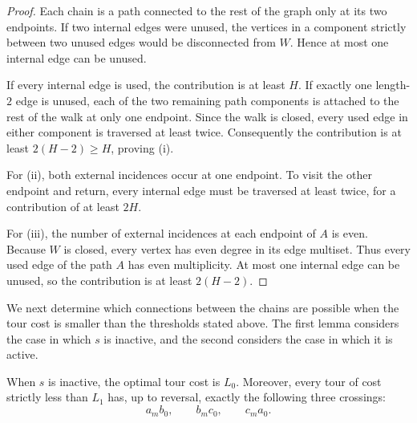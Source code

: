 \documentclass[12pt,a4paper,oneside]{report}
\begin{document}
\begin{proof}
Each chain is a path connected to the rest of the graph only at its two
endpoints.  If
two internal edges were unused, the vertices in a component strictly between
two unused edges would be disconnected from $W$.  Hence at most
one internal edge can be unused.

If every internal edge is used, the contribution is at least $H$.  If exactly
one length-$2$ edge is unused, each of the two remaining path components is
attached to the rest of the walk at only one endpoint.  Since the walk is
closed, every used edge in either component is traversed at least twice.
Consequently the contribution is at least $2(H-2)\ge H$, proving (i).

For (ii), both external incidences occur at one endpoint.  To visit the other
endpoint and return, every internal edge must be traversed at least twice, for
a contribution of at least $2H$.

For (iii), the number of external incidences at each endpoint of $A$ is even.
Because $W$ is closed, every vertex has even degree in its edge multiset.
Thus every used edge of the path $A$ has even multiplicity.  At most one
internal edge can be unused, so the contribution is at least $2(H-2)$.
\end{proof}

We next determine which connections between the chains are possible when the
tour cost is smaller than the thresholds stated above.  The first lemma
considers the case in which $s$ is inactive, and the second considers the case
in which it is active.

\begin{lemma}\label{lem:inactive-low-cost}
When $s$ is inactive, the optimal tour cost is $L_0$.  Moreover, every tour of
cost strictly less than $L_1$ has, up to reversal, exactly the following three
crossings:
\begin{equation}\label{eq:inactive-crossings}
  a_mb_0,
  \qquad
  b_mc_0,
  \qquad
  c_ma_0.
\end{equation}
\end{lemma}
\end{document}
